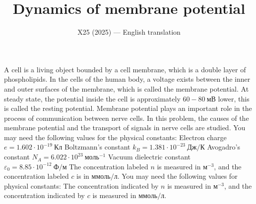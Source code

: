 \documentclass[11pt,a4paper]{article}
\title{\textbf{Dynamics of membrane potential}}
\author{\normalsize X25 (2025) — English translation}
\date{}
\begin{document}
\maketitle
A cell is a living object bounded by a cell membrane, which is a double layer of phospholipids. In the cells of the human body, a voltage exists between the inner and outer surfaces of the membrane, which is called the membrane potential. At steady state, the potential inside the cell is approximately $60-80~мВ$ lower, this is called the resting potential. Membrane potential plays an important role in the process of communication between nerve cells. In this problem, the causes of the membrane potential and the transport of signals in nerve cells are studied. You may need the following values for the physical constants: Electron charge $e=1.602\cdot10^{-19}~Кл$ Boltzmann's constant $k_B=1.381\cdot10^{-23}~Дж/К$ Avogadro's constant $N_A=6.022\cdot10^{23}~моль^{-1}$ Vacuum dielectric constant $\varepsilon_0=8.85\cdot10^{-12}~Ф/м$ The concentration labeled $n$ is measured in $м^{-3}$, and the concentration labeled $c$ is in $ммоль/л$.
You may need the following values for physical constants:
The concentration indicated by $n$ is measured in $м^{-3}$, and the concentration indicated by $c$ is measured in $ммоль/л$.
\end{document}
